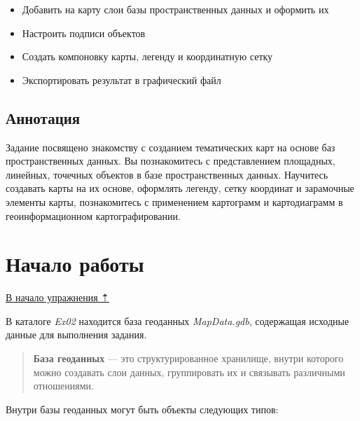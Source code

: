 \documentclass[]{book}
\providecommand{\tightlist}{%
  \setlength{\itemsep}{0pt}\setlength{\parskip}{0pt}}
\theoremstyle{definition}
\theoremstyle{definition}
\theoremstyle{definition}
\theoremstyle{remark}
\begin{document}
\begin{itemize}
\tightlist
\item
  Добавить на карту слои базы пространственных данных и оформить их
\item
  Настроить подписи объектов
\item
  Создать компоновку карты, легенду и координатную сетку
\item
  Экспортировать результат в графический файл
\end{itemize}

\hypertarget{map-design-economic-annotation}{%
\subsection{Аннотация}\label{map-design-economic-annotation}}

Задание посвящено знакомству с созданием тематических карт на основе баз
пространственных данных. Вы познакомитесь с представлением площадных,
линейных, точечных объектов в базе пространственных данных. Научитесь
создавать карты на их основе, оформлять легенду, сетку координат и
зарамочные элементы карты, познакомитесь с применением картограмм и
картодиаграмм в геоинформационном картографировании.

\hypertarget{map-design-economic-begin}{%
\section{Начало работы}\label{map-design-economic-begin}}

\protect\hyperlink{map-design-economic}{В начало упражнения ⇡}

В каталоге \emph{Ex02} находится база геоданных \emph{MapData.gdb},
содержащая исходные данные для выполнения задания.

\begin{quote}
\textbf{База геоданных} --- это структурированное хранилище, внутри
которого можно создавать слои данных, группировать их и связывать
различными отношениями.
\end{quote}

Внутри базы геоданных могут быть объекты следующих типов:
\end{document}
